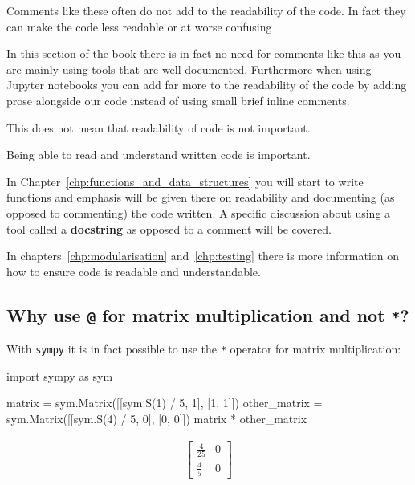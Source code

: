Comments like these often do not add to the readability of the code. In fact
they can make the code less readable or at worse
confusing~\cite{martin2009clean}.

In this section of the book there is in fact no need for comments like this as
you are mainly using tools that are well documented. Furthermore when using
Jupyter notebooks you can add far more to the readability of the code by adding
prose alongside our code instead of using small brief inline comments.

This does not mean that readability of code is not important.


\begin{note}
Being able to read and understand written code is important.
\end{note}



In Chapter~\ref{chp:functions_and_data_structures}
you will start to write functions and emphasis will
be given there on readability and documenting (as opposed to commenting) the
code written. A specific discussion about using a tool called a
\textbf{docstring} as opposed to a comment will be covered.


In chapters~\ref{chp:modularisation} and~\ref{chp:testing} there is more
information on how to ensure code is readable and understandable.


\subsection{Why use \texttt{@} for matrix multiplication and not \texttt{*}?}
\label{\detokenize{tools-for-mathematics/04-matrices/why/main:why-do-we-use-for-matrix-multiplication-and-not}}

With \texttt{sympy} it is in fact possible to use the \texttt{*} operator for matrix
multiplication:

\begin{pyin}
import sympy as sym

matrix = sym.Matrix([[sym.S(1) / 5, 1], [1, 1]])
other_matrix = sym.Matrix([[sym.S(4) / 5, 0], [0, 0]])
matrix * other_matrix
\end{pyin}




\begin{equation*}
\begin{split}\displaystyle \left[\begin{matrix}\frac{4}{25} & 0\\\frac{4}{5} & 0\end{matrix}\right]\end{split}
\end{equation*}




